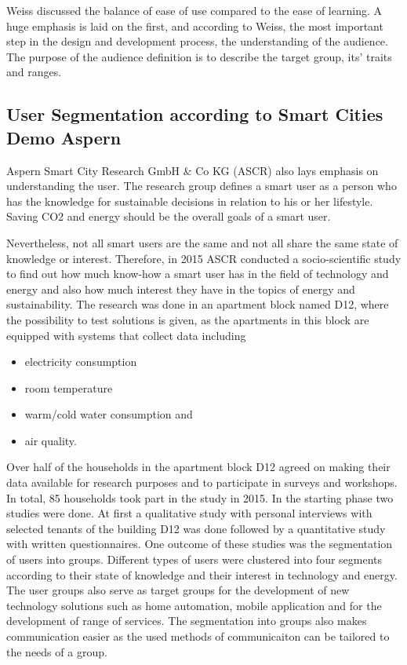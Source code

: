 Weiss \cite{weiss2003handheld} discussed the balance of ease of use compared to the ease of learning. A huge emphasis is laid on the first, and according to Weiss, the most important step in the design and development process, the understanding of the audience. The purpose of the audience definition is to describe the target group, its' traits and ranges.
\\


\subsection{User Segmentation according to Smart Cities Demo Aspern}
\label{chap:usersegmentation}

Aspern Smart City Research GmbH \& Co KG (ASCR) also lays emphasis on understanding the user. The research group defines a smart user as a person who has the knowledge for sustainable decisions in relation to his or her lifestyle. Saving CO2 and energy should be the overall goals of a smart user.

Nevertheless, not all smart users are the same and not all share the same state of knowledge or interest. Therefore, in 2015 ASCR conducted a socio-scientific study to find out how much know-how a smart user has in the field of technology and energy and also how much interest they have in the topics of energy and sustainability. The research was done in an apartment block named D12, where the possibility to test solutions is given, as the apartments in this block are equipped with systems that collect data including

\begin{itemize}
	\item electricity consumption
	\item room temperature
	\item warm/cold water consumption and
	\item air quality.
\end{itemize}

Over half of the households in the apartment block D12 agreed on making their data available for research purposes and to participate in surveys and workshops. In total, 85 households took part in the study in 2015. In the starting phase two studies were done. At first a qualitative study with personal interviews with selected tenants of the building D12 was done followed by a quantitative study with written questionnaires. One outcome of these studies was the segmentation of users into groups. Different types of users were clustered into four segments according to their state of knowledge and their interest in technology and energy. The user groups also serve as target groups for the development of new technology solutions such as home automation, mobile application and for the development of range of services. The segmentation into groups also makes communication easier as the used methods of communicaiton can be tailored to the needs of a group.

